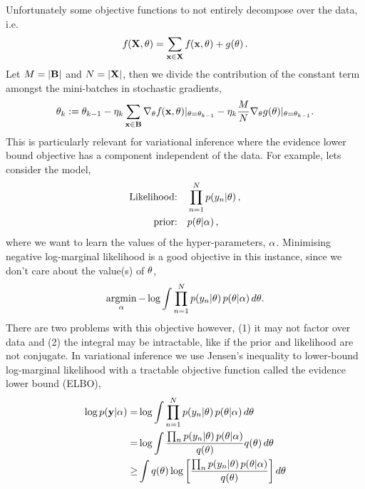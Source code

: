 \documentclass[11pt, oneside]{article}
\begin{document}
Unfortunately some objective functions to not entirely decompose over the data,
i.e. 
\begin{equation}
    f_{}\!\left({{\mathbf{X}, \theta}}\right) = \sum_{\mathbf{x} \in \mathbf{X}} f_{}\!\left({{\mathbf{x}, \theta}}\right)
    + {g}_{}\!\left({{\theta}}\right).
    \label{eq:objwconst}
\end{equation}
Let $M = |\mathbf{B}|$ and $N = |\mathbf{X}|$, then we divide the contribution of the
constant term amongst the mini-batches in stochastic gradients,
\begin{equation}
    \theta_k := \theta_{k-1} - \eta_k \sum_{\mathbf{x} \in \mathbf{B}}
    \nabla_{\theta} f_{}\!\left({{\mathbf{x}, \theta}}\right)\!|_{\theta = \theta_{k-1}}
    - \eta_k \frac{M}{N} \nabla_{\theta} 
    {g}_{}\!\left({{\theta}}\right)\!|_{\theta = \theta_{k-1}}.
    \label{eq:wsg}
\end{equation} 
This is particularly relevant for variational inference where the evidence
lower bound objective has a component independent of the data. For example, 
lets consider the model,
\begin{align}
    \text{Likelihood:} \quad &\prod^N_{n=1} p\!\left({y_n}\middle\vert{\ensuremath{\theta}}\right), \\
    \text{prior:} \quad &p\!\left({\theta}\middle\vert{\ensuremath{\alpha}}\right),
\end{align}
where we want to learn the values of the hyper-parameters, $\alpha$. Minimising
negative log-marginal likelihood is a good objective in this instance, since we
don't care about the value(s) of $\theta$,
\begin{equation}
    \operatorname*{\operatorname*{argmin}}_{\alpha} - \log \int \prod^N_{n=1} p\!\left({y_n}\middle\vert{\ensuremath{\theta}}\right)
    p\!\left({\theta}\middle\vert{\ensuremath{\alpha}}\right) d \theta.
    \label{eq:lml}
\end{equation}
There are two problems with this objective however, (1) it may not factor over
data and (2) the integral may be intractable, like if the prior and likelihood
are not conjugate. In variational inference we use Jensen's inequality to
lower-bound log-marginal likelihood with a tractable objective function called
the evidence lower bound (ELBO),
\begin{align}
    \log \probC{\targ}{\hyper} =& \log \int 
        \prod^N_{n=1} \probC{\targs_n}{\param} 
        \probC{\param}{\hyper} d \param \nonumber \\
        =& \log \int 
        \frac{\prod_n \probC{\targs_n}{\param} \probC{\param}{\hyper}}
        {\qrob{\param}} \qrob{\param} d \param \nonumber \\
        \geq& \int \qrob{\param} \log \sbrac{%
            \frac{\prod_n \probC{\targs_n}{\param} 
            \probC{\param}{\hyper}}{\qrob{\param}}}
        d \param
\end{align}
\end{document}
